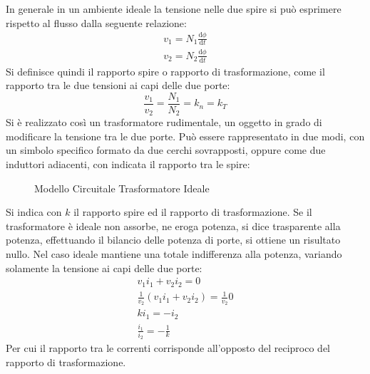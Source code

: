 \documentclass{article}
\newcommand{\df}{\mathrm{d}}
\numberwithin{equation}{subsection}
\begin{document}
In generale in un ambiente ideale la tensione nelle due spire si può esprimere rispetto al flusso dalla seguente relazione:
\begin{gather*}
    v_1=\displaystyle N_1\frac{\df\phi}{\df t}\\
    v_2=\displaystyle N_2\frac{\df\phi}{\df t}
\end{gather*}
Si definisce quindi il rapporto spire o rapporto di trasformazione, come il rapporto tra le due tensioni ai capi delle due porte:
\begin{equation}
    \displaystyle\frac{v_1}{v_2}=\frac{N_1}{N_2}=k_n=k_T
\end{equation}
Si è realizzato così un trasformatore rudimentale, un oggetto in grado di modificare la tensione tra le due porte. Può essere rappresentato in due modi, con un simbolo 
specifico formato da due cerchi sovrapposti, oppure come due induttori adiacenti, con indicata il rapporto tra le spire:
\begin{figure}[H]%
    \centering
    \qquad
    \caption{Modello Circuitale Trasformatore Ideale}%
    \label{fig:trasformatore-ideale}
\end{figure}
Si indica con $k$ il rapporto spire ed il rapporto di trasformazione. Se il trasformatore è ideale non assorbe, ne eroga potenza, si dice trasparente alla potenza, effettuando 
il bilancio delle potenza di porte, si ottiene un risultato nullo. Nel caso ideale mantiene una totale indifferenza alla potenza, variando solamente la tensione ai capi delle 
due porte:
\begin{gather*}
    v_1i_1+v_2i_2=0\\
    \displaystyle\frac{1}{v_2}\left(v_1i_1+v_2i_2\right)=\frac{1}{v_2}0\\
    ki_1=-i_2\\
    \displaystyle\frac{i_1}{i_2}=-\frac{1}{k}
\end{gather*}
Per cui il rapporto tra le correnti corrisponde all'opposto del reciproco del rapporto di trasformazione. 
\end{document}

